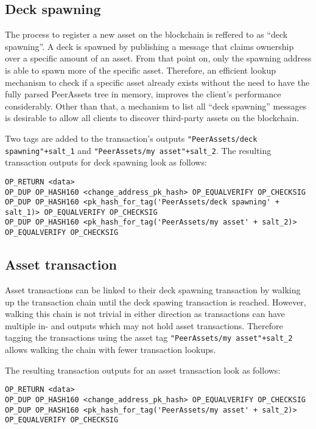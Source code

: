 \documentclass[a4paper,10pt]{article}
\begin{document}
\subsection{Deck spawning}
The process to register a new asset on the blockchain is reffered to as ``deck spawning''. A deck is spawned by publishing a message that claims ownership over a specific amount of an asset. From that point on, only the spawning address is able to spawn more of the specific asset. Therefore, an efficient lookup mechanism to check if a specific asset already exists without the need to have the fully parsed PeerAssets tree in memory, improves the client's performance considerably. Other than that, a mechanism to list all ``deck spawning'' messages is desirable to allow all clients to discover third-party assets on the blockchain.

Two tags are added to the transaction's outputs \verb|"PeerAssets/deck spawning"+salt_1| and \verb|"PeerAssets/my asset"+salt_2|.
The resulting transaction outputs for deck spawning look as follows:
\begin{small}\begin{verbatim}
OP_RETURN <data>
OP_DUP OP_HASH160 <change_address_pk_hash> OP_EQUALVERIFY OP_CHECKSIG
OP_DUP OP_HASH160 <pk_hash_for_tag('PeerAssets/deck spawning' + salt_1)> OP_EQUALVERIFY OP_CHECKSIG
OP_DUP OP_HASH160 <pk_hash_for_tag('PeerAssets/my asset' + salt_2)> OP_EQUALVERIFY OP_CHECKSIG
\end{verbatim}\end{small}

\subsection{Asset transaction}
Asset transactions can be linked to their deck spawning transaction by walking up the transaction chain until the deck spawing transaction is reached.
However, walking this chain is not trivial in either direction as transactions can have multiple in- and outputs which may not hold asset transactions.
Therefore tagging the transactions using the asset tag \verb|"PeerAssets/my asset"+salt_2| allows walking the chain with fewer transaction lookups.

The resulting transaction outputs for an asset transaction look as follows:
\begin{small}\begin{verbatim}
OP_RETURN <data>
OP_DUP OP_HASH160 <change_address_pk_hash> OP_EQUALVERIFY OP_CHECKSIG
OP_DUP OP_HASH160 <pk_hash_for_tag('PeerAssets/my asset' + salt_2)> OP_EQUALVERIFY OP_CHECKSIG
\end{verbatim}\end{small}
\end{document}
